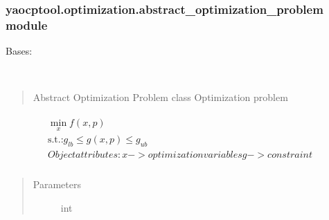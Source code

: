 \documentclass[letterpaper,10pt,english]{sphinxmanual}
\begin{document}
\subsubsection{yaocptool.optimization.abstract\_optimization\_problem module}
\label{\detokenize{yaocptool.optimization:module-yaocptool.optimization.abstract_optimization_problem}}\label{\detokenize{yaocptool.optimization:yaocptool-optimization-abstract-optimization-problem-module}}

\begin{fulllineitems}
\label{\detokenize{yaocptool.optimization:yaocptool.optimization.abstract_optimization_problem.AbstractOptimizationProblem}}
Bases: 

\begin{fulllineitems}
\label{\detokenize{yaocptool.optimization:yaocptool.optimization.abstract_optimization_problem.AbstractOptimizationProblem.__init__}}~\begin{quote}

Abstract Optimization Problem class
Optimization problem
\end{quote}
\begin{align*}\!\begin{aligned}
\min_x f(x, p)\\
\textrm{s.t.:} g_{lb} \leq g(x,p) \leq g_{ub}\\
Object attributes:
x -> optimization variables
g -> constraint\\
\end{aligned}\end{align*}\begin{quote}\begin{description}
\item[{Parameters}] \leavevmode
{} \textendash{} int

\end{description}\end{quote}


\end{fulllineitems}
\end{fulllineitems}
\end{document}
